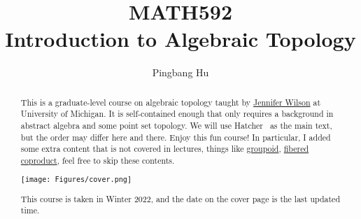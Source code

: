 \documentclass[a4paper]{report}
\author{Pingbang Hu}
\title{MATH592\\Introduction to Algebraic Topology}
\begin{document}
\maketitle

\begin{abstract}
	This is a graduate-level course on algebraic topology taught by \href{http://www.math.lsa.umich.edu/~jchw/}{Jennifer Wilson} at University of Michigan. It is self-contained enough that only requires a background in abstract algebra and some point set topology. We will use Hatcher~\cite{hatcher2002algebraic} as the main text, but the order may differ here and there. Enjoy this fun course! In particular, I added some extra content that is not covered in lectures, things like \hyperref[def:groupoid]{groupoid}, \hyperref[def:fibered-coproduct]{fibered coproduct}, feel free to skip these contents.

	\vfill
	\begin{center}
		\texttt{[image: Figures/cover.png]}
	\end{center}
	\vfill
	This course is taken in Winter 2022, and the date on the cover page is the last updated time.
\end{abstract}

\tableofcontents

\newpage


\newpage
\appendix
\appendixpage{}



\newpage
\pagestyle{plain}
\printbibliography{}
\end{document}
